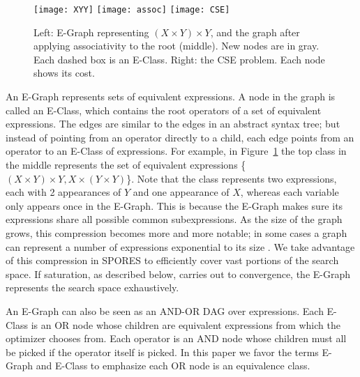 \begin{figure}
\centering
    \texttt{[image: XYY]} \qquad \texttt{[image: assoc]} \qquad 
\texttt{[image: CSE]} 
    \vspace{7pt}
    \caption{Left: E-Graph representing $(X \times Y) \times Y$, and the graph after applying
      associativity to the root (middle). New nodes are in gray. Each dashed box is an E-Class.
      Right: the CSE problem. Each node shows its cost.}
    \label{assoc}
    \vspace{10pt}
\end{figure}

An E-Graph represents sets of equivalent expressions. A node in the graph is
called an E-Class, which contains the root operators of a set of equivalent
expressions. The edges are similar to the edges in an abstract syntax tree; but
instead of pointing from an operator directly to a child, each edge points from
an operator to an E-Class of expressions. For example, in Figure~\ref{assoc} the
top class in the middle represents the set of equivalent expressions \{$(X\times Y)\times Y,
X\times (Y\times Y)$\}. Note that the class represents two expressions, each with 2
appearances of $Y$ and one appearance of $X$, whereas each variable only appears
once in the E-Graph. This is because the E-Graph makes sure its expressions share
all possible common subexpressions. As the size of the graph grows, this
compression becomes more and more notable; in some cases a graph can 
represent a number of expressions exponential to its
size \cite{DBLP:journals/corr/abs-1012-1802}. We take advantage of this
compression in SPORES to efficiently cover vast portions of the search
space. If saturation, as described below, carries out to convergence, the E-Graph represents the search space exhaustively. 

An E-Graph can also be seen as an AND-OR DAG over expressions. Each E-Class is an OR node whose children are equivalent expressions from
which the optimizer chooses from. Each operator is an AND node whose children must all be picked if the operator itself is picked. In this paper we favor the terms E-Graph and E-Class to emphasize each OR node is an equivalence class. 

